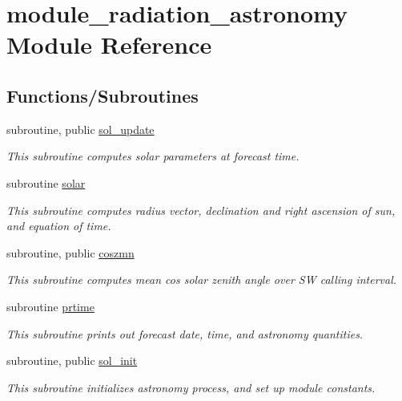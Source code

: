 \hypertarget{namespacemodule__radiation__astronomy}{}\section{module\+\_\+radiation\+\_\+astronomy Module Reference}
\label{namespacemodule__radiation__astronomy}
\subsection*{Functions/\+Subroutines}
\begin{DoxyCompactItemize}
\item 
subroutine, public \hyperlink{group__module__radiation__astronomy_gaf1997565a45e04ac5261be36708384cf}{sol\+\_\+update}
\begin{DoxyCompactList}\small\item\em This subroutine computes solar parameters at forecast time. \end{DoxyCompactList}\item 
subroutine \hyperlink{group__module__radiation__astronomy_gab295ff320cb8720fde46e80ee6573f08}{solar}
\begin{DoxyCompactList}\small\item\em This subroutine computes radius vector, declination and right ascension of sun, and equation of time. \end{DoxyCompactList}\item 
subroutine, public \hyperlink{group__module__radiation__astronomy_gae8382ae3394204b9b4c30fe6210a2f9d}{coszmn}
\begin{DoxyCompactList}\small\item\em This subroutine computes mean cos solar zenith angle over SW calling interval. \end{DoxyCompactList}\item 
subroutine \hyperlink{group__module__radiation__astronomy_ga44ddc71547a446b199afaa05dc9dd868}{prtime}
\begin{DoxyCompactList}\small\item\em This subroutine prints out forecast date, time, and astronomy quantities. \end{DoxyCompactList}\end{DoxyCompactItemize}
{\bf }\par
\begin{DoxyCompactItemize}
\item 
subroutine, public \hyperlink{group__module__radiation__astronomy_gae467712e3e8cd9a7d8e87533e17d3ecb}{sol\+\_\+init}
\begin{DoxyCompactList}\small\item\em This subroutine initializes astronomy process, and set up module constants. \end{DoxyCompactList}\end{DoxyCompactItemize}

